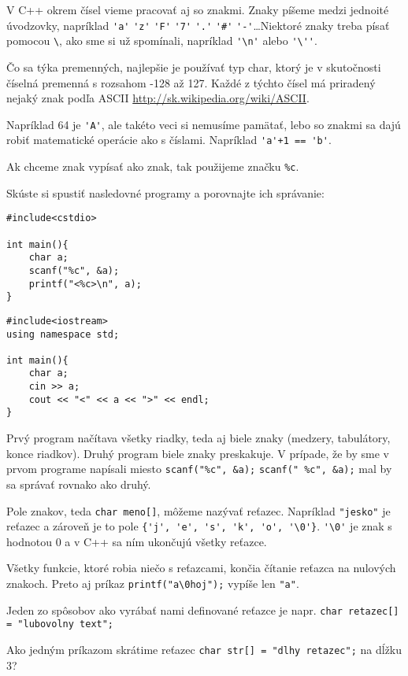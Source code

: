 V C++ okrem čísel vieme pracovať aj so znakmi. Znaky píšeme medzi jednoité
úvodzovky, napríklad \verb!'a'! \verb!'z'! \verb!'F'! \verb!'7'! \verb!'.'!
\verb!'#'! \verb!'-'!\dots Niektoré znaky treba písať pomocou \verb'\', ako sme
si už spomínali, napríklad \verb!'\n'! alebo \verb!'\''!.

Čo sa týka premenných, najlepšie je používať typ char, ktorý je v skutočnosti
číselná premenná s rozsahom -128 až 127. Každé z týchto čísel má priradený
nejaký znak podľa ASCII \url{http://sk.wikipedia.org/wiki/ASCII}. 

Napríklad 64 je \verb!'A'!, ale takéto veci si nemusíme pamätať,
lebo so znakmi sa dajú robiť matematické operácie ako s číslami. 
Napríklad \verb!'a'+1 == 'b'!.

Ak chceme znak vypísať ako znak, tak použijeme značku \verb!%c!. 

\cvicenie Skúste si spustiť nasledovné programy a porovnajte ich správanie:

\begin{lstlisting}
#include<cstdio>

int main(){
    char a;
    scanf("%c", &a);
    printf("<%c>\n", a);
}
\end{lstlisting}
\begin{lstlisting}
#include<iostream>
using namespace std;

int main(){
    char a;
    cin >> a;
    cout << "<" << a << ">" << endl;
}
\end{lstlisting}

\riesenie Prvý program načítava všetky riadky, teda aj biele znaky
(medzery, tabulátory, konce riadkov). Druhý program biele znaky preskakuje.
V prípade, že by sme v prvom programe napísali miesto \verb!scanf("%c", &a);!
\verb!scanf(" %c", &a);! mal by sa správať rovnako ako druhý.

\medskip

Pole znakov, teda \verb!char meno[]!, môžeme nazývať reťazec. 
Napríklad \verb!"jesko"! je reťazec a zároveň je to pole
\verb!{'j', 'e', 's', 'k', 'o', '\0'}!. \verb!'\0'! je znak s hodnotou 0
a v C++ sa ním ukončujú všetky reťazce. 

Všetky funkcie, ktoré robia niečo s reťazcami, končia čítanie reťazca
na nulových znakoch. Preto aj príkaz \verb!printf("a\0hoj");! vypíše len \verb!"a"!. 

Jeden zo spôsobov ako vyrábať nami definované reťazce je napr.
\verb!char retazec[] = "lubovolny text";!

\cvicenie Ako jedným príkazom skrátime reťazec 
\verb!char str[] = "dlhy retazec";! na dĺžku 3?

